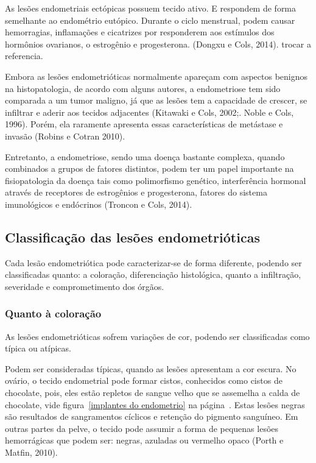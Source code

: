 \documentclass[12pt]{article} %
\begin{document}
As lesões endometriais ectópicas possuem tecido ativo. E respondem de
forma semelhante ao endométrio eutópico. Durante o ciclo menstrual,
podem causar hemorragias, inflamações e cicatrizes por responderem aos
estímulos dos hormônios ovarianos, o estrogênio e
progesterona. (Dongxu e Cols, 2014). trocar a referencia.

Embora as lesões endometrióticas normalmente apareçam com aspectos
benignos na histopatologia, de acordo com alguns autores, a
endometriose tem sido comparada a um tumor maligno, já que as lesões
tem a capacidade de crescer, se infiltrar e aderir aos tecidos
adjacentes (Kitawaki e Cols, 2002;. Noble e Cols, 1996). Porém, ela
raramente apresenta essas características de metástase e invasão
(Robins e Cotran 2010). 

Entretanto, a endometriose, sendo uma doença bastante complexa, 
quando combinados a grupos de fatores distintos, podem ter um papel
importante na fisiopatologia da doença tais como polimorfismo 
genético, interferência hormonal através de receptores de estrogênios
e progesterona, fatores do sistema imunológicos e endócrinos (Troncon
e Cols, 2014).

\subsection{Classificação das lesões endometrióticas}
Cada lesão endometriótica pode caracterizar-se de forma diferente, podendo ser classificadas
quanto: a coloração, diferenciação histológica, quanto a infiltração, severidade e comprometimento dos órgãos.


\subsubsection{Quanto à coloração} 

As lesões endometrióticas sofrem variações de cor, podendo ser classificadas como típica ou atípicas.

Podem ser consideradas típicas, quando as lesões apresentam a cor
escura.  No ovário, o tecido endometrial pode formar cistos,
conhecidos como cistos de chocolate, pois, eles estão repletos de
sangue velho que se assemelha a calda de chocolate, vide
figura~\ref{implantes do endometrio} na página~\pageref{implantes do
  endometrio}. Estas lesões negras são resultados de sangramentos
cíclicos e retenção do pigmento sanguíneo. Em outras partes da pelve,
o tecido pode assumir a forma de pequenas lesões hemorrágicas que
podem ser: negras, azuladas ou vermelho opaco (Porth e Matfin, 2010).
\end{document}
